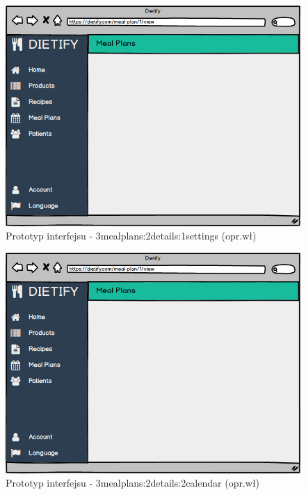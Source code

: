 \begin{minipage}{\textwidth}
    \begin{figure}[H]
        \centering\includegraphics[scale=0.55]{../mockup/3mealplans_2details_1settings.png}
        \caption{Prototyp interfejsu - 3mealplans:2details:1settings (opr.wł)}\label{rysunek:3mealplans_2details_1settings}
    \end{figure}
\end{minipage}
\begin{minipage}{\textwidth}
    \begin{figure}[H]
        \centering\includegraphics[scale=0.55]{../mockup/3mealplans_2details_2calendar.png}
        \caption{Prototyp interfejsu - 3mealplans:2details:2calendar (opr.wł)}\label{rysunek:3mealplans_2details_2calendar}
    \end{figure}
\end{minipage}
